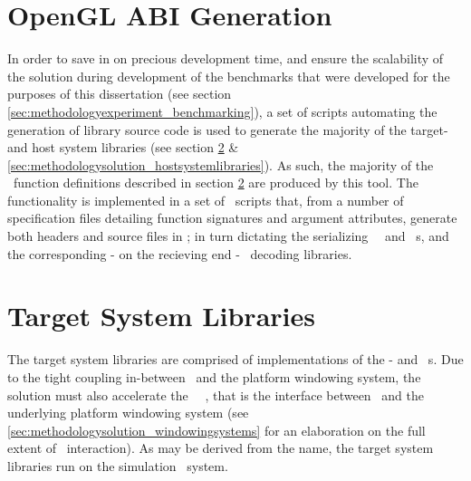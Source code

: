 \section{OpenGL ABI Generation}
\label{sec:methodologysolution_openglabigeneration}
In order to save in on precious development time, and ensure the scalability of the solution during development of the benchmarks that were developed for the purposes of this dissertation (see section \ref{sec:methodologyexperiment_benchmarking}), a set of scripts automating the generation of library source code is used to generate the majority of the target- and host system libraries (see section \ref{sec:methodologysolution_targetsystemlibraries} \& \ref{sec:methodologysolution_hostsystemlibraries}).
As such, the majority of the \dvttermopengl\ function definitions described in section \ref{sec:methodologysolution_targetsystemlibraries} are produced by this tool.
The functionality is implemented in a set of \dvttermpython\ scripts that, from a number of specification files detailing function signatures and argument attributes, generate both headers and source files in \dvttermc ; in turn dictating the serializing \dvttermtarget\ \dvttermopengl\ and \dvttermegl\ \dvttermabi s, and the corresponding - on the recieving end - \dvttermhost\ decoding libraries.


\section{Target System Libraries}
\label{sec:methodologysolution_targetsystemlibraries}
The target system libraries are comprised of implementations of the \dvttermegl - and \dvttermopengl\ \dvttermapi s.
Due to the tight coupling in-between \dvttermopengl\ and the platform windowing system, the solution must also accelerate the \dvttermkhronos\ \dvttermegl\ \dvttermapi , that is the interface between \dvttermopengl\ and the underlying platform windowing system (see \ref{sec:methodologysolution_windowingsystems} for an elaboration on the full extent of \dvttermegl\ interaction).
As may be derived from the name, the target system libraries run on the simulation \dvttermtarget\ system.

